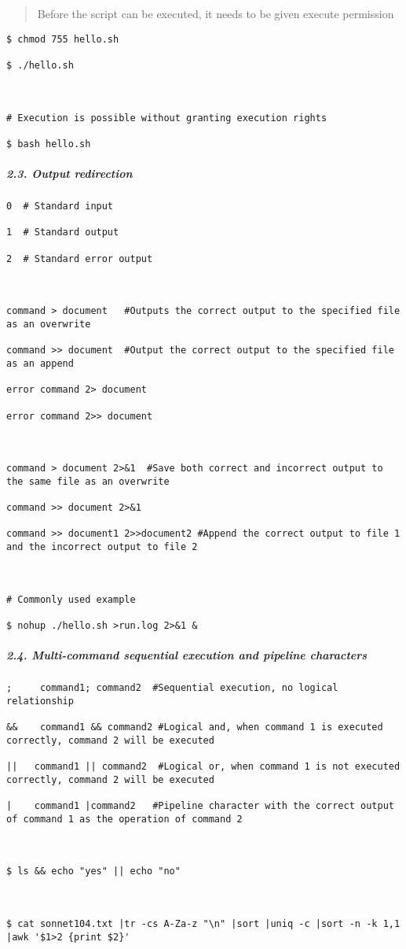 \documentclass[
]{article}
\begin{document}
\begin{quote}
Before the script can be executed, it needs to be given execute
permission
\end{quote}

\begin{verbatim}
$ chmod 755 hello.sh

$ ./hello.sh



# Execution is possible without granting execution rights

$ bash hello.sh
\end{verbatim}

\hypertarget{header-n288}{%
\subparagraph{2.3. Output redirection}\label{header-n288}}

\begin{verbatim}
0  # Standard input

1  # Standard output

2  # Standard error output



command > document   #Outputs the correct output to the specified file as an overwrite

command >> document  #Output the correct output to the specified file as an append

error command 2> document

error command 2>> document



command > document 2>&1  #Save both correct and incorrect output to the same file as an overwrite

command >> document 2>&1

command >> document1 2>>document2 #Append the correct output to file 1 and the incorrect output to file 2



# Commonly used example

$ nohup ./hello.sh >run.log 2>&1 &
\end{verbatim}

\hypertarget{header-n298}{%
\subparagraph{2.4. Multi-command sequential execution and pipeline
characters}\label{header-n298}}

\begin{verbatim}
;     command1; command2  #Sequential execution, no logical relationship

&&    command1 && command2 #Logical and, when command 1 is executed correctly, command 2 will be executed

||   command1 || command2  #Logical or, when command 1 is not executed correctly, command 2 will be executed

|    command1 |command2   #Pipeline character with the correct output of command 1 as the operation of command 2



$ ls && echo "yes" || echo "no"



$ cat sonnet104.txt |tr -cs A-Za-z "\n" |sort |uniq -c |sort -n -k 1,1 |awk '$1>2 {print $2}'
\end{verbatim}
\end{document}
